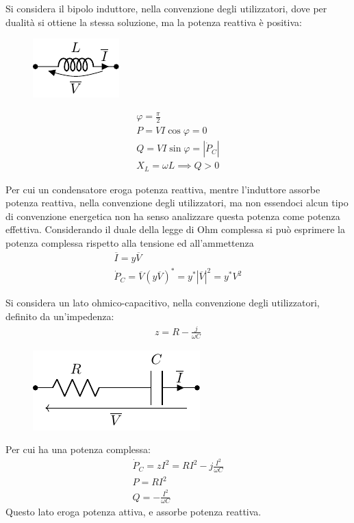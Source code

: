 \documentclass{article}
\numberwithin{equation}{subsection}
\begin{document}
Si considera il bipolo induttore, nella convenzione degli utilizzatori, dove per dualità si ottiene la stessa soluzione, ma la potenza reattiva è positiva:
\begin{figure}[H]%
    \centering
    \includegraphics{induttore-fasori.pdf}%
\end{figure}
\begin{gather*}
    \varphi=\displaystyle\frac{\pi}{2}\\
    P=VI\cos\varphi=0\\
    Q=VI\sin\varphi=|\dot P_C|\\
    X_L=\omega L\implies Q>0
\end{gather*}

Per cui un condensatore eroga potenza reattiva, mentre l'induttore assorbe potenza reattiva, nella convenzione degli utilizzatori, ma non essendoci alcun tipo di convenzione 
energetica non ha senso analizzare questa potenza come potenza effettiva. 
Considerando il duale della legge di Ohm complessa si può esprimere la potenza complessa rispetto alla tensione ed all'ammettenza
\begin{gather*}
    \overline{I}=y\overline{V}\\
    \dot P_C=\overline{V}(y\overline{V})^*=y^*|\overline{V}|^2=y^*V^2
\end{gather*} 


Si considera un lato ohmico-capacitivo, nella convenzione degli utilizzatori, definito da un'impedenza:
\begin{gather*}
    z=R-\displaystyle\frac{j}{\omega C}
\end{gather*}
\begin{figure}[H]%
    \centering
    \includegraphics{rc-serie-fasori.pdf}%
    \label{fig:rc-serie-fasori}
\end{figure}
Per cui ha una potenza complessa:
\begin{gather*}
    \dot P_C=zI^2=RI^2-j\displaystyle\frac{I^2}{\omega C}\\
    P=RI^2\\
    Q=-\displaystyle\frac{I^2}{\omega C}
\end{gather*}
Questo lato eroga potenza attiva, e assorbe potenza reattiva. 
\end{document}
